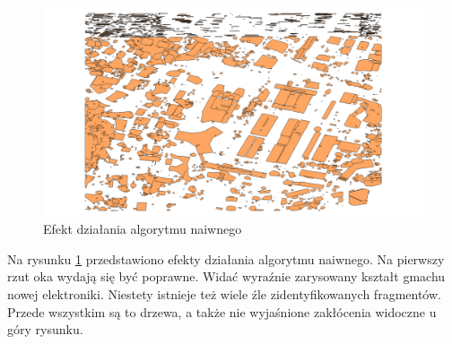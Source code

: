 \begin{figure}[h!]
    \centering
    \includegraphics[width=\linewidth]{img/wynik_naiwny.png}
    \caption{Efekt działania algorytmu naiwnego}
    \label{fig:wynik_naiwny}
\end{figure}

Na rysunku \ref{fig:wynik_naiwny} przedstawiono efekty działania algorytmu naiwnego.
Na pierwszy rzut oka wydają się być poprawne. Widać wyraźnie zarysowany kształt gmachu
nowej elektroniki. Niestety istnieje też wiele źle zidentyfikowanych fragmentów. Przede
wszystkim są to drzewa, a także nie wyjaśnione zakłócenia widoczne u góry rysunku.

